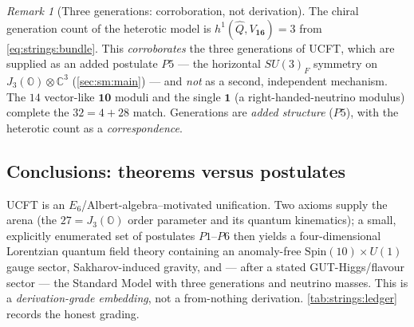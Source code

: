 \documentclass[11pt]{article}
\theoremstyle{plain}
\theoremstyle{definition}
\theoremstyle{remark}
\newtheorem{remark}[theorem]{Remark}
\begin{document}
\begin{remark}[Three generations: corroboration, not derivation]
\label{rem:strings:gen}
The chiral generation count of the heterotic model is
$h^{1}(\widehat{Q},V_{\mathbf{16}})=3$ from \eqref{eq:strings:bundle}.
This \emph{corroborates} the three generations of UCFT, which are
supplied as an added postulate $P5$ --- the horizontal $SU(3)_{F}$
symmetry on $J_{3}(\mathbb{O})\otimes\mathbb{C}^{3}$
(\autoref{sec:sm:main}) --- and \emph{not} as a second, independent
mechanism. The $14$ vector-like $\mathbf{10}$ moduli and the single
$\mathbf{1}$ (a right-handed-neutrino modulus) complete the
$32=4+28$ match. Generations are \emph{added structure} ($P5$), with the
heterotic count as a \emph{correspondence}.
\end{remark}

\subsection{Conclusions: theorems versus postulates}
\label{sec:strings:conclusions}

UCFT is an $E_{6}$/Albert-algebra--motivated unification. Two axioms
supply the arena (the $27=J_{3}(\mathbb{O})$ order parameter and its
quantum kinematics); a small, explicitly enumerated set of postulates
$P1$--$P6$ then yields a four-dimensional Lorentzian quantum field theory
containing an anomaly-free $\mathrm{Spin}(10)\times U(1)$ gauge sector,
Sakharov-induced gravity, and --- after a stated GUT-Higgs/flavour sector
--- the Standard Model with three generations and neutrino masses. This
is a \emph{derivation-grade embedding}, not a from-nothing derivation.
\autoref{tab:strings:ledger} records the honest grading.
\end{document}
